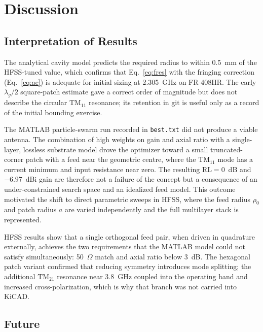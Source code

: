 %
%
%
%

\chapter{Discussion}

\section{Interpretation of Results}

The analytical cavity model predicts the required radius to within 0.5~mm of the HFSS-tuned value, which confirms that Eq.~\ref{eq:fres} with the fringing correction (Eq.~\ref{eq:ae}) is adequate for initial sizing at 2.305~GHz on FR-408HR. The early $\lambda_g/2$ square-patch estimate gave a correct order of magnitude but does not describe the circular $\mathrm{TM}_{11}$ resonance; its retention in git is useful only as a record of the initial bounding exercise.

The MATLAB particle-swarm run recorded in \texttt{best.txt} did not produce a viable antenna. The combination of high weights on gain and axial ratio with a single-layer, lossless substrate model drove the optimizer toward a small truncated-corner patch with a feed near the geometric centre, where the $\mathrm{TM}_{11}$ mode has a current minimum and input resistance near zero. The resulting RL${}=0$~dB and $-6.97$~dBi gain are therefore not a failure of the concept but a consequence of an under-constrained search space and an idealized feed model. This outcome motivated the shift to direct parametric sweeps in HFSS, where the feed radius $\rho_0$ and patch radius $a$ are varied independently and the full multilayer stack is represented.

HFSS results show that a single orthogonal feed pair, when driven in quadrature externally, achieves the two requirements that the MATLAB model could not satisfy simultaneously: 50~$\Omega$ match and axial ratio below 3~dB. The hexagonal patch variant confirmed that reducing symmetry introduces mode splitting; the additional $\mathrm{TM}_{21}$ resonance near 3.8~GHz coupled into the operating band and increased cross-polarization, which is why that branch was not carried into KiCAD.

\section{Future}

